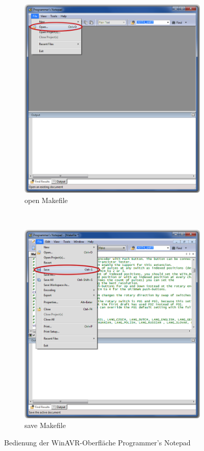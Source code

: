 \begin{figure}[H]
  \begin{subfigure}[b]{.5\textwidth}
    \centering
    \includegraphics[width=.85\textwidth]{../PNG/Notepad_open.png}
    \caption{open Makefile}
  \end{subfigure}
  ~
  \begin{subfigure}[b]{.5\textwidth}
    \centering
    \includegraphics[width=.85\textwidth]{../PNG/Notepad_save.png}
    \caption{save Makefile}
  \end{subfigure}
  \caption{Bedienung der WinAVR-Oberfläche Programmer's Notepad}
  \label{fig:WinAVR1}
\end{figure}

